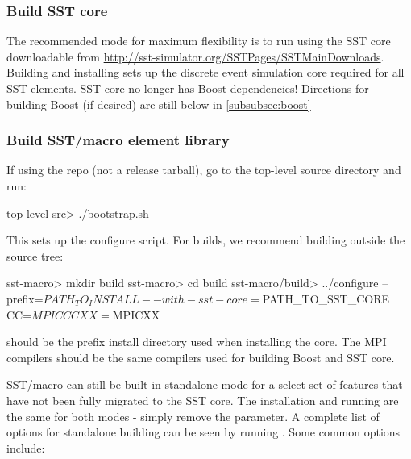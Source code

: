 \subsubsection{Build SST core}\label{subsec:buildSSTCore}
The recommended mode for maximum flexibility is to run using the SST core downloadable from \url{http://sst-simulator.org/SSTPages/SSTMainDownloads}.
Building and installing sets up the discrete event simulation core required for all SST elements.
SST core no longer has Boost dependencies! Directions for building Boost (if desired) are still below in \ref{subsubsec:boost}

\subsubsection{Build SST/macro element library}\label{subsec:buildElementLib}
If using the repo (not a release tarball), go to the top-level source directory and run:
\begin{ShellCmd}
top-level-src> ./bootstrap.sh
\end{ShellCmd}
This sets up the configure script. For builds, we recommend building outside the source tree:

\begin{ShellCmd}
sst-macro> mkdir build
sst-macro> cd build
sst-macro/build> ../configure --prefix=$PATH_TO_INSTALL --with-sst-core=$PATH_TO_SST_CORE CC=$MPICC CXX=$MPICXX
\end{ShellCmd}
 should be the prefix install directory used when installing the core.  
The MPI compilers should be the same compilers used for building Boost and SST core.

SST/macro can still be built in standalone mode for a select set of features that have not been fully migrated to the SST core.  
The installation and running are the same for both modes - simply remove the  parameter.  
A complete list of options for standalone building can be seen by running .   Some common options include:

